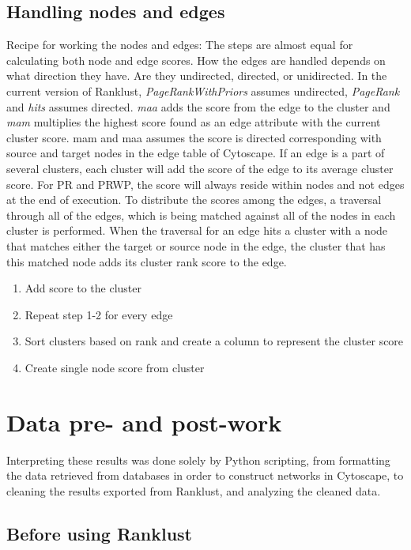 \section{Handling nodes and edges}
Recipe for working the nodes and edges: The steps are almost equal for
calculating both node and edge scores. How the edges are handled depends on what
direction they have. Are they undirected, directed, or unidirected. In the
current version of Ranklust, \textit{PageRankWithPriors} assumes undirected,
\textit{PageRank} and \textit{\gls{hits}} assumes directed. \textit{\gls{maa}}
adds the score from the edge to the cluster and \textit{\gls{mam}} multiplies
the highest score found as an edge attribute with the current cluster score.
\gls{mam} and \gls{maa} assumes the score is directed corresponding with source
and target nodes in the edge table of Cytoscape. If an edge is a part of
several clusters, each cluster will add the score of the edge to its average
cluster score. For PR and PRWP, the score will always reside within nodes and
not edges at the end of execution. To distribute the scores among the edges, a
traversal through all of the edges, which is being matched against all of the
nodes in each cluster is performed. When the traversal for an edge hits a
cluster with a node that matches either the target or source node in the edge,
the cluster that has this matched node adds its cluster rank score to the edge.

\begin{enumerate}
    \item Add score to the cluster
    \item Repeat step 1-2 for every edge
    \item Sort clusters based on rank and create a column to represent the
        cluster score
    \item Create single node score from cluster
\end{enumerate}

\chapter{Data pre- and post-work}
Interpreting these results was done solely by Python scripting, from formatting
the data retrieved from databases in order to construct networks in Cytoscape,
to cleaning the results exported from Ranklust, and analyzing the cleaned data. 

\section{Before using Ranklust}
